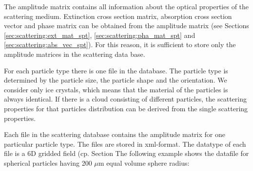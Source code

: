 The amplitude matrix contains all information about the optical
properties of the scattering medium. Extinction cross section
matrix, absorption cross section vector and phase matrix can be
obtained from the amplitude matrix (see Sections
\ref{sec:scattering:ext_mat_spt}, \ref{sec:scattering:pha_mat_spt}  and
\ref{sec:scattering:abs_vec_spt}).
For this reason, it is sufficient to store only the amplitude matrices
in the scattering data base. 

For each particle type there is one file in the database.
The particle type is determined by the particle size, the particle
shape and the
orientation. We consider only ice crystals, which means that the
material of the
particles is always identical. If there is a cloud consisting of
different particles, the scattering properties for that particles
distribution can be derived from the single scattering properties.

Each file in the scattering database contains the amplitude matrix for
one particular particle type. The files are stored in xml-format. The
datatype of each file is a 6D gridded field (cp. Section
The following example shows the datafile
for spherical particles having 200 $\mu$m equal volume sphere radius:

